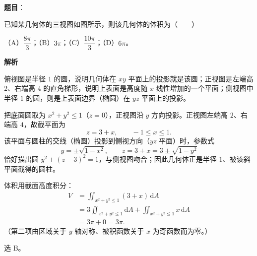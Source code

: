\begin{answer}

\textbf{题目}：

已知某几何体的三视图如图所示，则该几何体的体积为\mbox{（　　）}
\nopagebreak[4]
\begin{center}\end{center}
\nopagebreak[4]
（A）$\dfrac{8\pi}{3}$；（B）$3\pi$；（C）$\dfrac{10\pi}{3}$；（D）$6\pi$。

\textbf{解析}

俯视图是半径 $1$ 的圆，说明几何体在 $xy$ 平面上的投影就是该圆；正视图是左端高 $2$、右端高 $4$ 的直角梯形，说明上表面是高度随 $x$ 线性增加的一个平面；侧视图中半径 $1$ 的圆，则是上表面边界（椭圆）在 $yz$ 平面上的投影。

把底面圆取为 $x^2+y^2\leqslant1$（$z=0$），正视图沿 $y$ 方向投影。正视图左端高 $2$、右端高 $4$，故截平面为
\nopagebreak[4]
\[z=3+x,\qquad -1\leqslant x\leqslant1.\]
该平面与圆柱的交线（椭圆）投影到侧视方向（$yz$ 平面）时，参数式
\nopagebreak[4]
\[y=\pm\sqrt{1-x^2},\qquad z=3+x=3\pm\sqrt{1-y^2}\]
恰好描出圆 $y^2+(z-3)^2=1$，与侧视图吻合；因此几何体正是半径 $1$、被该斜平面截得的圆柱。

体积用截面高度积分：
\nopagebreak[4]
\[\begin{aligned}
V&=\iint_{x^2+y^2\leqslant1}(3+x)\,\mathrm dA\\
&=3\iint_{x^2+y^2\leqslant1}\mathrm dA+\iint_{x^2+y^2\leqslant1}x\,\mathrm dA\\
&=3\pi+0=3\pi .
\end{aligned}\]
（第二项由区域关于 $y$ 轴对称、被积函数关于 $x$ 为奇函数而为零。）

选 B。


\end{answer}
